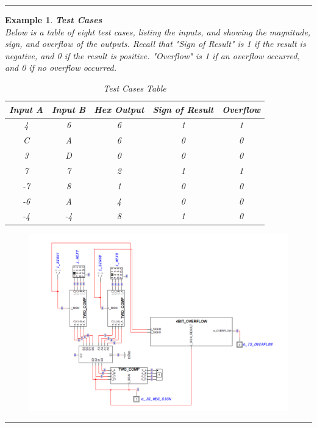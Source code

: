\documentclass[12pt]{article}
\newtheorem{example}{Example}
\newenvironment{examp}
{\vspace{0.5cm}
\hrule
\begin{example}}
{\hrule
\vspace{0.5cm}
\end{example}}
\begin{document}
\begin{examp}
	\textbf{Test Cases} \\
	Below is a table of eight test cases, listing the inputs, and showing the magnitude, sign, and overflow of the outputs.
	Recall that "Sign of Result" is 1 if the result is negative, and 0 if the result is positive. "Overflow" is 1 if an overflow occurred, and 0 if no overflow occurred.
	\begin{table}[H]
		\centering
		\begin{tabular}{|c|c|c|c|c|}
			\hline
			\textbf{Input A} & \textbf{Input B} & \textbf{Hex Output} & \textbf{Sign of Result} & \textbf{Overflow} \\
			\hline
			4                & 6                & 6                   & 1                       & 1                 \\
			C                & A                & 6                   & 0                       & 0                 \\
			3                & D                & 0                   & 0                       & 0                 \\
			7                & 7                & 2                   & 1                       & 1                 \\
			-7               & 8                & 1                   & 0                       & 0                 \\
			-6               & A                & 4                   & 0                       & 0                 \\
			-4               & -4               & 8                   & 1                       & 0                 \\
			\hline
		\end{tabular}
		\caption{Test Cases Table}
	\end{table}
	\begin{figure}[H]
		\includegraphics[scale=.65]{overflower.png}

\end{figure}
\end{examp}
\end{document}
